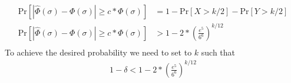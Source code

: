 \begin{enumerate}[(i)]
\[\begin{split}
\text{Pr}[|\hat{\Phi}(\sigma) - \Phi(\sigma)| \geq c * \Phi(\sigma)] &= 1 - \text{Pr}[X > k/2] - \text{Pr}[Y > k/2]\\
\text{Pr}[|\hat{\Phi}(\sigma) - \Phi(\sigma)| \geq c * \Phi(\sigma)] &> 1 - 2 *  (\frac{e^5}{6^6})^{k/12}\\
\end{split}
\]
To achieve the desired probability we need to set to $k$ such that 
\[
\begin{split}
1 - \delta < 1 - 2 *  (\frac{e^5}{6^6})^{k/12}\\
\end{split}
\]
\end{enumerate}

